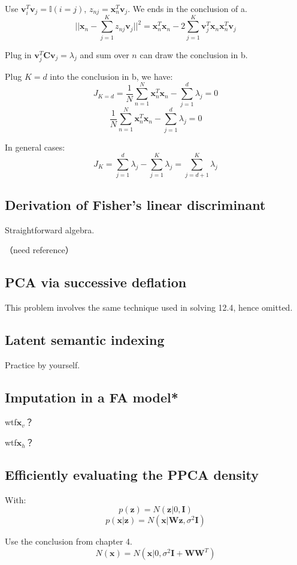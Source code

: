 \documentclass[UTF8]{ctexart}
\begin{document}
Use $\textbf{v}_{i}^{T}\textbf{v}_{j}=\mathbb{I}(i=j)$, $z_{nj}=\textbf{x}_{n}^{T}\textbf{v}_{j}$. We ends in the conclusion of a.
$$||\textbf{x}_{n}-\sum_{j=1}^{K}z_{nj}\textbf{v}_{j}||^{2}=\textbf{x}_{n}^{T}\textbf{x}_{n} - 2\sum_{j=1}^{K}\textbf{v}_{j}^{T}\textbf{x}_{n}\textbf{x}_{n}^{T}\textbf{v}_{j}$$

Plug in $\textbf{v}_{j}^{T}\textbf{C}\textbf{v}_{j}=\lambda_{j}$ and sum over $n$ can draw the conclusion in b.

Plug $K=d$ into the conclusion in b, we have:
$$J_{K=d}=\frac{1}{N}\sum_{n=1}^{N}\textbf{x}_{n}^{T}\textbf{x}_{n}-\sum_{j=1}^{d}\lambda_{j}=0$$
$$\frac{1}{N}\sum_{n=1}^{N}\textbf{x}_{n}^{T}\textbf{x}_{n}-\sum_{j=1}^{d}\lambda_{j}=0$$

In general cases:
$$J_{K}=\sum_{j=1}^{d}\lambda_{j}-\sum_{j=1}^{K}\lambda_{j}=\sum_{j=d+1}^{K}\lambda_{j}$$

\subsection{Derivation of Fisher's linear discriminant}
Straightforward algebra.

（need reference）

\subsection{PCA via successive deflation}
This problem involves the same technique used in solving 12.4, hence omitted. 

\subsection{Latent semantic indexing}
Practice by yourself.

\subsection{Imputation in a FA model*}
wtf$\textbf{x}_{v}$？

wtf$\textbf{x}_{h}$？


\subsection{Efficiently evaluating the PPCA density}
With:
$$p(\textbf{z})=N(\textbf{z}|0,\textbf{I})$$
$$p(\textbf{x}|\textbf{z})=N(\textbf{x}|\textbf{W}\textbf{z},\sigma^{2}\textbf{I})$$

Use the conclusion from chapter 4.
$$N(\textbf{x})=N(\textbf{x}|0,\sigma^{2}\textbf{I}+\textbf{W}\textbf{W}^{T})$$
\end{document}

